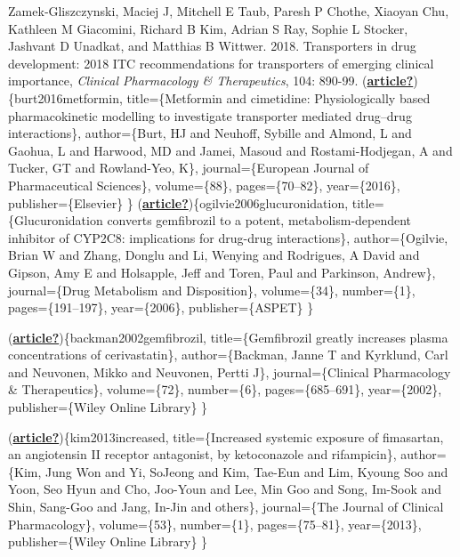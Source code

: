 \documentclass[
  11pt,
  krantz2, a4paper, twoside]{krantz}
\begin{document}
Zamek‐Gliszczynski, Maciej J, Mitchell E Taub, Paresh P Chothe, Xiaoyan
Chu, Kathleen M Giacomini, Richard B Kim, Adrian S Ray, Sophie L
Stocker, Jashvant D Unadkat, and Matthias B Wittwer. 2018.
\textquotesingle Transporters in drug development: 2018 ITC recommendations for
transporters of emerging clinical importance\textquotesingle, \emph{Clinical Pharmacology \&
Therapeutics}, 104: 890-99.
(\protect\hyperlink{ref-article}{\textbf{article?}})\{burt2016metformin,
title=\{Metformin and cimetidine: Physiologically based pharmacokinetic modelling to investigate transporter mediated drug--drug interactions\},
author=\{Burt, HJ and Neuhoff, Sybille and Almond, L and Gaohua, L and Harwood, MD and Jamei, Masoud and Rostami-Hodjegan, A and Tucker, GT and Rowland-Yeo, K\},
journal=\{European Journal of Pharmaceutical Sciences\},
volume=\{88\},
pages=\{70--82\},
year=\{2016\},
publisher=\{Elsevier\}
\}
(\protect\hyperlink{ref-article}{\textbf{article?}})\{ogilvie2006glucuronidation,
title=\{Glucuronidation converts gemfibrozil to a potent, metabolism-dependent inhibitor of CYP2C8: implications for drug-drug interactions\},
author=\{Ogilvie, Brian W and Zhang, Donglu and Li, Wenying and Rodrigues, A David and Gipson, Amy E and Holsapple, Jeff and Toren, Paul and Parkinson, Andrew\},
journal=\{Drug Metabolism and Disposition\},
volume=\{34\},
number=\{1\},
pages=\{191--197\},
year=\{2006\},
publisher=\{ASPET\}
\}

(\protect\hyperlink{ref-article}{\textbf{article?}})\{backman2002gemfibrozil,
title=\{Gemfibrozil greatly increases plasma concentrations of cerivastatin\},
author=\{Backman, Janne T and Kyrklund, Carl and Neuvonen, Mikko and Neuvonen, Pertti J\},
journal=\{Clinical Pharmacology \& Therapeutics\},
volume=\{72\},
number=\{6\},
pages=\{685--691\},
year=\{2002\},
publisher=\{Wiley Online Library\}
\}

(\protect\hyperlink{ref-article}{\textbf{article?}})\{kim2013increased,
title=\{Increased systemic exposure of fimasartan, an angiotensin II receptor antagonist, by ketoconazole and rifampicin\},
author=\{Kim, Jung Won and Yi, SoJeong and Kim, Tae-Eun and Lim, Kyoung Soo and Yoon, Seo Hyun and Cho, Joo-Youn and Lee, Min Goo and Song, Im-Sook and Shin, Sang-Goo and Jang, In-Jin and others\},
journal=\{The Journal of Clinical Pharmacology\},
volume=\{53\},
number=\{1\},
pages=\{75--81\},
year=\{2013\},
publisher=\{Wiley Online Library\}
\}
\end{document}

